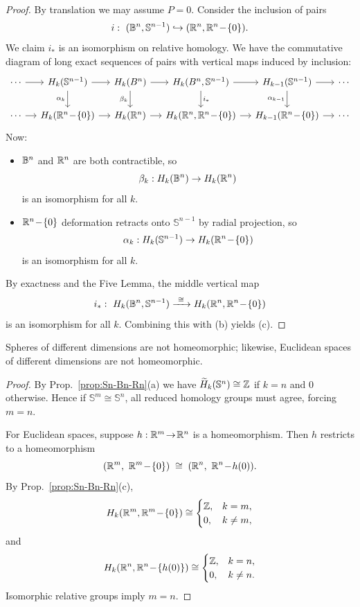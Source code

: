 \begin{proof}
By translation we may assume $P=0$. Consider the inclusion of pairs
\[
i:\ (\B^n,\mathbb{S}^{n-1})\hookrightarrow (\Bbb R^n,\Bbb R^n\!-\!\{0\}).
\]
We claim $i_*$ is an isomorphism on relative homology. We have the commutative diagram of long exact sequences of pairs with vertical maps induced by inclusion:
\[
\begin{tikzcd}[column sep=small]
\cdots \ar[r] & H_k(\mathbb{S}^{n-1}) \ar[r] \ar[d,"{\alpha_k}"'] 
& H_k(B^n) \ar[r] \ar[d,"{\beta_k}"'] 
& H_k(B^n,\mathbb{S}^{n-1}) \ar[r] \ar[d,"{i_*}"] 
& H_{k-1}(\mathbb{S}^{n-1}) \ar[r] \ar[d,"{\alpha_{k-1}}"'] 
& \cdots \\
\cdots \ar[r] & H_k(\Bbb R^n\!-\!\{0\}) \ar[r] 
& H_k(\Bbb R^n) \ar[r] 
& H_k(\Bbb R^n,\Bbb R^n\!-\!\{0\}) \ar[r] 
& H_{k-1}(\Bbb R^n\!-\!\{0\}) \ar[r] 
& \cdots
\end{tikzcd}
\]
Now:
\begin{itemize}
\item $\mathbb{B}^n$ and $\Bbb R^n$ are both contractible, so 
\[\beta_k:H_k(\mathbb{B}^n)\to H_k(\Bbb R^n)\] 
is an isomorphism for all $k$.

\item $\Bbb R^n\!-\!\{0\}$ deformation retracts onto $\mathbb{S}^{n-1}$ by radial projection,
so 
\[\alpha_k:H_k(\mathbb{S}^{n-1})\to H_k(\Bbb R^n\!-\!\{0\})\] 
is an isomorphism for all $k$.
\end{itemize}
By exactness and the Five Lemma, the middle vertical map
\[
i_*:\ H_k(\B^n,\mathbb{S}^{n-1}) \xrightarrow{\ \cong\ } H_k(\Bbb R^n,\Bbb R^n\!-\!\{0\})
\]
is an isomorphism for all $k$. Combining this with (b) yields (c).
\end{proof}


\begin{corollary}\label{cor:2.9}
Spheres of different dimensions are not homeomorphic; likewise, Euclidean
spaces of different dimensions are not homeomorphic.
\end{corollary}

\begin{proof}
By Prop.~\ref{prop:Sn-Bn-Rn}(a) we have
$\widetilde H_k(\mathbb{S}^n)\cong \Bbb Z$ if $k=n$ and $0$ otherwise. Hence if
$\mathbb{S}^m\cong \mathbb{S}^n$, all reduced homology groups must agree, forcing $m=n$.

For Euclidean spaces, suppose $h:\Bbb R^m\!\to\!\Bbb R^n$ is a homeomorphism.
Then $h$ restricts to a homeomorphism
\[
(\Bbb R^m,\ \Bbb R^m\!-\!\{0\}) \;\cong\; (\Bbb R^n,\ \Bbb R^n\!-\!h(0)).
\]
By Prop.~\ref{prop:Sn-Bn-Rn}(c),
\[
H_k(\Bbb R^m,\Bbb R^m\!-\!\{0\})
\cong\begin{cases}\Bbb Z,& k=m,\\ 0,& k\neq m,\end{cases}\]
and
\[
H_k(\Bbb R^n,\Bbb R^n\!-\!\{h(0)\})
\cong\begin{cases}\Bbb Z,& k=n,\\ 0,& k\neq n.\end{cases}
\]
Isomorphic relative groups imply $m=n$.
\end{proof}

